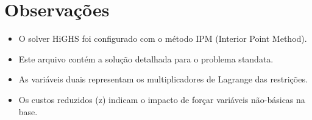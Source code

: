 \documentclass[12pt]{article}
\begin{document}
\section{Observações}

\begin{itemize}
\item O solver HiGHS foi configurado com o método IPM (Interior Point Method).
\item Este arquivo contém a solução detalhada para o problema standata.
\item As variáveis duais representam os multiplicadores de Lagrange das restrições.
\item Os custos reduzidos (z) indicam o impacto de forçar variáveis não-básicas na base.
\end{itemize}
\end{document}
